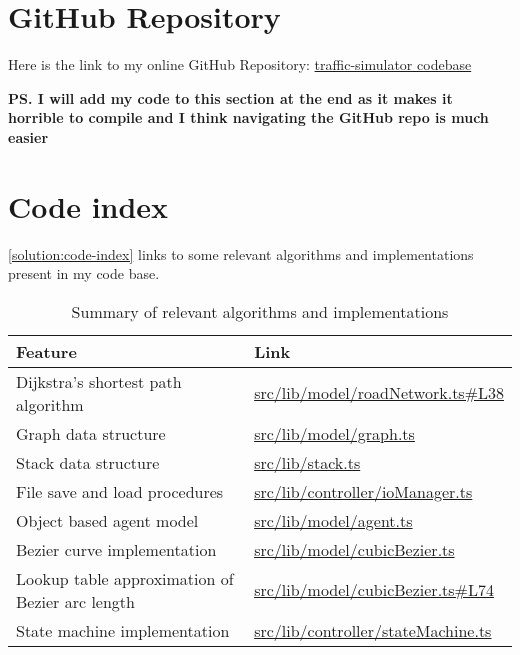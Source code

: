 \section{GitHub Repository}

    Here is the link to my online GitHub Repository: \href{https://github.com/joshua-smart/traffic-simulator}{traffic-simulator codebase}

    \textbf{PS. I will add my code to this section at the end as it makes it horrible to compile and I think navigating the GitHub repo is much easier}

    \section{Code index}

    \autoref{solution:code-index} links to some relevant algorithms and implementations present in my code base.

    \begin{table}
        \centering
        \begin{tabular}{|p{}|p{}|}
            \hline
            \textbf{Feature} & \textbf{Link}
            \\\hline
            Dijkstra's shortest path algorithm & \href{https://github.com/joshua-smart/traffic-simulator/blob/main/src/lib/model/roadNetwork.ts#L38}{src/lib/model/roadNetwork.ts\#L38}
            \\\hline
            Graph data structure & \href{https://github.com/joshua-smart/traffic-simulator/blob/main/src/lib/model/graph.ts}{src/lib/model/graph.ts}
            \\\hline
            Stack data structure & \href{https://github.com/joshua-smart/traffic-simulator/blob/main/src/lib/stack.ts}{src/lib/stack.ts}
            \\\hline
            File save and load procedures & \href{https://github.com/joshua-smart/traffic-simulator/blob/main/src/lib/controller/ioManager.ts}{src/lib/controller/ioManager.ts}
            \\\hline
            Object based agent model & \href{https://github.com/joshua-smart/traffic-simulator/blob/main/src/lib/model/agent.ts}{src/lib/model/agent.ts}
            \\\hline
            Bezier curve implementation & \href{https://github.com/joshua-smart/traffic-simulator/blob/main/src/lib/model/cubicBezier.ts}{src/lib/model/cubicBezier.ts}
            \\\hline
            Lookup table approximation of Bezier arc length & \href{https://github.com/joshua-smart/traffic-simulator/blob/main/src/lib/model/cubicBezier.ts#L74}{src/lib/model/cubicBezier.ts\#L74}
            \\\hline
            State machine implementation & \href{https://github.com/joshua-smart/traffic-simulator/blob/main/src/lib/controller/stateMachine.ts}{src/lib/controller/stateMachine.ts}
            \\\hline
        \end{tabular}
        \caption{Summary of relevant algorithms and implementations}
        \label{solution:code-index}
    \end{table}

